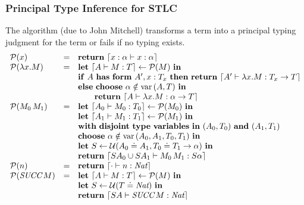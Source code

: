 \documentclass[pdftex,aspectratio=169]{beamer}
\begin{document}
\begin{frame}
  \frametitle{Principal Type Inference for STLC}
  \small
  The algorithm (due to John Mitchell) transforms a term into a principal typing judgment for
  the term or fails if no typing exists.
  \begin{displaymath}
    \begin{array}{lcl}
      \calP (x) &=& \mathbf{return}\ \Encode{x:\alpha \vdash x : \alpha} \\
      \calP (\Lam{x} M) &=&
      \mathbf{let}\ \Encode{\Tenv \vdash M : T} \gets \calP (M) \ \mathbf{in}\\
      && \mathbf{if}\ \Tenv\ \mathbf{has\ form}\ \Tenv', x:T_x \ \mathbf{then\ return}\ \Encode{\Tenv'
      \vdash \Lam{x}M : T_x \to T} \\
      && \mathbf{else}\ \mathbf{choose}\ \alpha\notin\var{(\Tenv,T)}\
      \mathbf{in} \\
      &&\qquad \mathbf{return}\ \Encode{\Tenv \vdash \Lam{x}M : \alpha\to T} \\
      \calP (\App{M_0}{M_1}) &=&
      \mathbf{let}\ \Encode{\Tenv_0\vdash M_0 : T_0} \gets \calP (M_0)\ \mathbf{in} \\
      && \mathbf{let}\ \Encode{\Tenv_1\vdash M_1 : T_1} \gets \calP (M_1)\
      \mathbf{in} \\
      && \mathbf{with\ disjoint\ type\ variables\ in\ } (\Tenv_0,
      T_0)\ \mathbf{and}\ (\Tenv_1, T_1) \\
      && \mathbf{choose}\ \alpha\notin \var{(\Tenv_0,\Tenv_1,
        T_0,T_1)}\ \mathbf{in} \\
      && \mathbf{let}\ S \gets \calU (\Tenv_0 \doteq \Tenv_1, T_0
      \doteq T_1 \to \alpha)\
      \mathbf{in} \\
      && \mathbf{return}\ \Encode{S\Tenv_0 \cup S\Tenv_1 \vdash
      \App{M_0}{M_1} : S\alpha} \\
      \calP (n) &=& \mathbf{return}\ \Encode{\cdot \vdash 
      n : \Nat} \\
      \calP (\Succ M) &=& \mathbf{let}\ \Encode{\Tenv \vdash M : T} \gets
      \calP (M)\ \mathbf{in} \\
      && \mathbf{let}\ S \gets \calU (T\doteq\Nat)\ \mathbf{in} \\\
      && \mathbf{return}\ \Encode{S\Tenv \vdash \Succ M: \Nat} 
    \end{array}
  \end{displaymath}
\end{frame}
\end{document}
